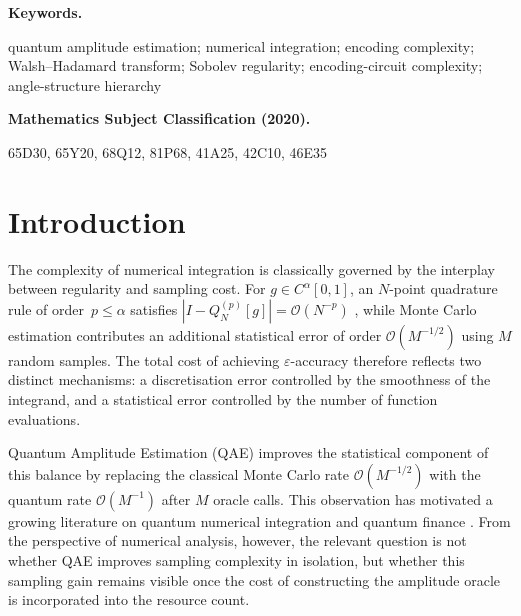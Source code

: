 \documentclass[12pt,a4paper]{article}
\theoremstyle{plain}
\theoremstyle{definition}
\theoremstyle{remark}
\newenvironment{keywords}{%
  \par\medskip\noindent\textbf{Keywords.}\enspace\ignorespaces
}{%
  \par\medskip
}
\newenvironment{subjclass}[1][2020]{%
  \par\noindent\textbf{Mathematics Subject Classification (#1).}\enspace\ignorespaces
}{%
  \par\bigskip
}
\begin{document}
\begin{keywords}
quantum amplitude estimation;
numerical integration;
encoding complexity;
Walsh--Hadamard transform;
Sobolev regularity;
encoding-circuit complexity;
angle-structure hierarchy
\end{keywords}

\begin{subjclass}[2020]
65D30, 65Y20, 68Q12, 81P68, 41A25, 42C10, 46E35
\end{subjclass}

\section{Introduction}
\label{sec:intro}

The complexity of numerical integration is classically governed by the
interplay between regularity and sampling cost.
For $g \in C^\alpha[0,1]$, an $N$-point quadrature rule of order~$p\leq\alpha$
satisfies $|I - Q_N^{(p)}[g]| = \mathcal{O}(N^{-p})$
\cite{DavisRabinowitz1984}, while Monte Carlo estimation contributes an
additional statistical error of order $\mathcal{O}(M^{-1/2})$ using
$M$ random samples.
The total cost of achieving $\varepsilon$-accuracy therefore reflects
two distinct mechanisms: a discretisation error controlled by the
smoothness of the integrand, and a statistical error controlled by the
number of function evaluations.

Quantum Amplitude Estimation (QAE) \cite{BrassardHoyerMoscaTapp2002}
improves the statistical component of this balance by replacing the
classical Monte Carlo rate $\mathcal{O}(M^{-1/2})$ with the quantum rate
$\mathcal{O}(M^{-1})$ after $M$ oracle calls.
This observation has motivated a growing literature on quantum numerical
integration \cite{AbramsWilliams1999,Montanaro2015} and quantum finance
\cite{WoernerEgger2019,StamatopoulosEtAl2019,EggerEtAl2019}.
From the perspective of numerical analysis, however, the relevant
question is not whether QAE improves sampling complexity in isolation,
but whether this sampling gain remains visible once the cost of
constructing the amplitude oracle is incorporated into the resource
count.
\end{document}

